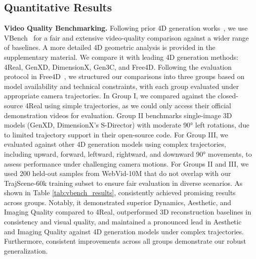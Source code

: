 \begin{table}[t!]
{\begin{tabular}{c|l|l|cccccc}
\end{tabular}
}
\vspace{-4mm}
\end{table}


\subsection{Quantitative Results}
\label{sec:quantitative}
\noindent\textbf{Video Quality Benchmarking.} Following prior 4D generation works~\cite{free4d}, we use VBench~\cite{vbench} for a fair and extensive video-quality comparison against a wider range of baselines. A more detailed 4D geometric analysis is provided in the supplementary material. We compare it with leading 4D generation methods: 4Real, GenXD, DimensionX, Gen3C, and Free4D. Following the evaluation protocol in Free4D~\cite{free4d}, we structured our comparisons into three groups based on model availability and technical constraints, with each group evaluated under appropriate camera trajectories. In Group I, we compared against the closed-source 4Real using simple trajectories, as we could only access their official demonstration videos for evaluation. Group II benchmarks single-image 3D models (GenXD, DimensionX's S-Director) with moderate 90° left rotations, due to limited trajectory support in their open-source code. For Group III, we evaluated against other 4D generation models using complex trajectories, including upward, forward, leftward, rightward, and downward 90° movements, to assess performance under challenging camera motions. For Groups II and III, we used 200 held-out samples from WebVid-10M that do not overlap with our TrajScene-60k training subset to ensure fair evaluation in diverse scenarios.  As shown in Table \ref{tab:vbench_results}, \ours consistently achieved promising results across groups. Notably, it demonstrated superior Dynamics, Aesthetic, and Imaging Quality compared to 4Real, outperformed 3D reconstruction baselines in consistency and visual quality, and maintained a pronounced lead in Aesthetic and Imaging Quality against 4D generation models under complex trajectories. Furthermore, consistent improvements across all groups demonstrate our robust generalization.



